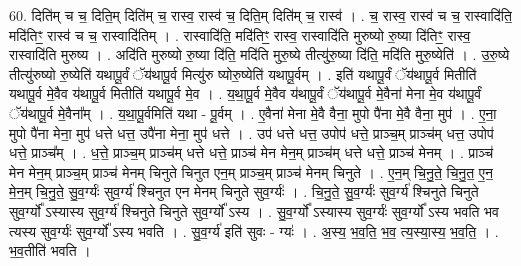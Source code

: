 \documentclass[17pt]{extarticle}
\begin{document}
60. दिति॑म् च च॒ दिति॒म् दिति॑म् च॒ रास्व॒ रास्व॑ च॒ दिति॒म् दिति॑म् च॒ रास्व॑ । . च॒ रास्व॒ रास्व॑ च च॒ रास्वादि॑ति॒ मदि॑तिꣳ॒॒ रास्व॑ च च॒ रास्वादि॑तिम् । . रास्वादि॑ति॒ मदि॑तिꣳ॒॒ रास्व॒ रास्वादि॑ति मुरुष्यो रु॒ष्या दि॑तिꣳ॒॒ रास्व॒ रास्वादि॑ति मुरुष्य । . अदि॑ति मुरुष्यो रु॒ष्या दि॑ति॒ मदि॑ति मुरु॒ष्ये तीत्यु॑रु॒ष्या दि॑ति॒ मदि॑ति मुरु॒ष्येति॑ । . उ॒रु॒ष्ये तीत्यु॑रुष्यो रु॒ष्येति॑ यथापू॒र्वं ॅय॑थापू॒र्व मित्यु॑रु ष्योरु॒ष्येति॑ यथापू॒र्वम् । . इति॑ यथापू॒र्वं ॅय॑थापू॒र्व मितीति॑ यथापू॒र्व मे॒वैव य॑थापू॒र्व मितीति॑ यथापू॒र्व मे॒व । . य॒था॒पू॒र्व मे॒वैव य॑थापू॒र्वं ॅय॑थापू॒र्व मे॒वैना॑ मेना मे॒व य॑थापू॒र्वं ॅय॑थापू॒र्व मे॒वैना᳚म् । . य॒था॒पू॒र्वमिति॑ यथा - पू॒र्वम् । . ए॒वैना॑ मेना मे॒वै वैना॒ मुपो पै॑ना मे॒वै वैना॒ मुप॑ । . ए॒ना॒ मुपो पै॑ना मेना॒ मुप॑ धत्ते धत्त॒ उपै॑ना मेना॒ मुप॑ धत्ते । . उप॑ धत्ते धत्त॒ उपोप॑ धत्ते॒ प्राञ्च॒म् प्राञ्च॑म् धत्त॒ उपोप॑ धत्ते॒ प्राञ्च᳚म् । . ध॒त्ते॒ प्राञ्च॒म् प्राञ्च॑म् धत्ते धत्ते॒ प्राञ्च॑ मेन मेन॒म् प्राञ्च॑म् धत्ते धत्ते॒ प्राञ्च॑ मेनम् । . प्राञ्च॑ मेन मेन॒म् प्राञ्च॒म् प्राञ्च॑ मेनम् चिनुते चिनुत एन॒म् प्राञ्च॒म् प्राञ्च॑ मेनम् चिनुते । . ए॒न॒म् चि॒नु॒ते॒ चि॒नु॒त॒ ए॒न॒ मे॒न॒म् चि॒नु॒ते॒ सु॒व॒र्ग्यः॑ सुव॒र्ग्य॑ श्चिनुत एन मेनम् चिनुते सुव॒र्ग्यः॑ । . चि॒नु॒ते॒ सु॒व॒र्ग्यः॑ सुव॒र्ग्य॑ श्चिनुते चिनुते सुव॒र्ग्यो᳚ ऽस्यास्य सुव॒र्ग्य॑ श्चिनुते चिनुते सुव॒र्ग्यो᳚ ऽस्य । . सु॒व॒र्ग्यो᳚ ऽस्यास्य सुव॒र्ग्यः॑ सुव॒र्ग्यो᳚ ऽस्य भवति भव त्यस्य सुव॒र्ग्यः॑ सुव॒र्ग्यो᳚ ऽस्य भवति । . सु॒व॒र्ग्य॑ इति॑ सुवः - ग्यः॑ । . अ॒स्य॒ भ॒व॒ति॒ भ॒व॒ त्य॒स्या॒स्य॒ भ॒व॒ति॒ । . भ॒व॒तीति॑ भवति । \newline
\pagebreak
{}
\end{document}
